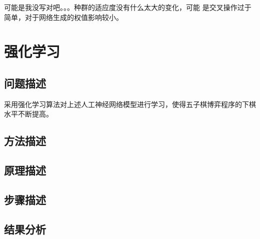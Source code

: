 \documentclass[UTF8]{article}
\begin{document}
可能是我没写对吧。。。种群的适应度没有什么太大的变化，可能
是交叉操作过于简单，对于网络生成的权值影响较小。


\section{强化学习}
\subsection{问题描述}
采用强化学习算法对上述人工神经网络模型进行学习，使得五子棋博弈程序的下棋
水平不断提高。
\subsection{方法描述}

\subsection{原理描述}

\subsection{步骤描述}

\subsection{结果分析}
\end{document}
